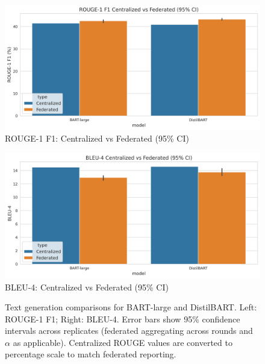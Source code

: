 \documentclass[conference]{IEEEtran}
\begin{document}
\begin{figure}[t]
    \centering
    \begin{minipage}[t]{0.48\textwidth}
        \centering
        \includegraphics[width=\linewidth]{../plots/generation/performance_comparison_rouge1.png}\\[-2pt]
        {\footnotesize ROUGE-1 F1: Centralized vs Federated (95\% CI)}
    \end{minipage}\hfill
    \begin{minipage}[t]{0.48\textwidth}
        \centering
        \includegraphics[width=\linewidth]{../plots/generation/performance_comparison_bleu4.png}\\[-2pt]
        {\footnotesize BLEU-4: Centralized vs Federated (95\% CI)}
    \end{minipage}
    \caption{Text generation comparisons for BART-large and DistilBART. Left: ROUGE-1 F1; Right: BLEU-4. Error bars show 95\% confidence intervals across replicates (federated aggregating across rounds and $\alpha$ as applicable). Centralized ROUGE values are converted to percentage scale to match federated reporting.}
    \label{fig:gen_cent_vs_fed}
\end{figure}
\end{document}
